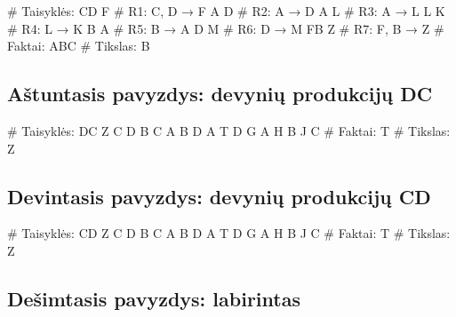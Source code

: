 \begin{pythonaienv}[fc]
# Taisyklės:
CD F                                    # R1: C, D → F
A D                                     # R2: A → D
A L                                     # R3: A → L
L K                                     # R4: L → K
B A                                     # R5: B → A
D M                                     # R6: D → M
FB Z                                    # R7: F, B → Z
# Faktai:
ABC
# Tikslas:
B
\end{pythonaienv}

\subsection{Aštuntasis pavyzdys: devynių produkcijų DC}

\begin{pythonaienv}[fc]
# Taisyklės:
DC Z
C D
B C
A B
D A
T D
G A
H B
J C
# Faktai:
T
# Tikslas:
Z
\end{pythonaienv}

\subsection{Devintasis pavyzdys: devynių produkcijų CD}

\begin{pythonaienv}[fc]
# Taisyklės:
CD Z
C D
B C
A B
D A
T D
G A
H B
J C
# Faktai:
T
# Tikslas:
Z
\end{pythonaienv}

\subsection{Dešimtasis pavyzdys: labirintas}

